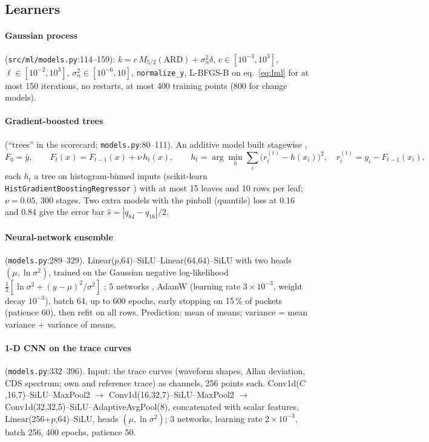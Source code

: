 \documentclass[10pt,a4paper]{article}
\newcommand{\code}[1]{\texttt{\small #1}}
\begin{document}
\subsection{Learners}
\paragraph{Gaussian process} (\code{src/ml/models.py}:114--159): $k=c\,M_{5/2}(\text{ARD})+\sigma_n^2\delta$,
$c\in[10^{-3},10^3]$, $\ell\in[10^{-2},10^3]$, $\sigma_n^2\in[10^{-6},10]$, \code{normalize\_y}, L-BFGS-B on eq.~\eqref{eq:lml}
for at most 150 iterations, no restarts, at most 400 training points (800 for change models).

\paragraph{Gradient-boosted trees} (``trees'' in the scorecard; \code{models.py}:80--111). An additive model built stagewise
\cite{friedman2001},
\begin{equation}
F_0=\bar y,\qquad F_t(x)=F_{t-1}(x)+\nu\,h_t(x),\qquad h_t=\arg\min_h\sum_i\big(r_i^{(t)}-h(x_i)\big)^2,\quad r_i^{(t)}=y_i-F_{t-1}(x_i),
\end{equation}
each $h_t$ a tree on histogram-binned inputs (scikit-learn \code{HistGradientBoostingRegressor} \cite{pedregosa2011,ke2017})
with at most 15 leaves and 10 rows per leaf; $\nu=0.05$, 300 stages. Two extra models with the pinball (quantile) loss
\cite{koenker1978} at 0.16 and 0.84 give the error bar $\hat s=|q_{84}-q_{16}|/2$.

\paragraph{Neural-network ensemble} (\code{models.py}:289--329). Linear($p$,64)--SiLU--Linear(64,64)--SiLU \cite{elfwing2018} with two
heads $(\mu,\ln\sigma^2)$, trained on the Gaussian negative log-likelihood $\tfrac12[\ln\sigma^2+(y-\mu)^2/\sigma^2]$
\cite{nix1994}; 5 networks \cite{lakshminarayanan2017}, AdamW \cite{loshchilov2019} (learning rate $3\times10^{-3}$, weight decay $10^{-3}$),
batch 64, up to 600 epochs, early stopping on 15\,\% of packets (patience 60), then refit on all rows. Prediction: mean of means;
variance = mean variance + variance of means.

\paragraph{1-D CNN on the trace curves} (\code{models.py}:332--396). Input: the trace curves (waveform shapes, Allan deviation,
CDS spectrum; own and reference trace) as channels, 256 points each. Conv1d($C$,16,7)--SiLU--MaxPool2 $\to$ Conv1d(16,32,7)--SiLU--MaxPool2
$\to$ Conv1d(32,32,5)--SiLU--AdaptiveAvgPool(8), concatenated with scalar features, Linear(256+$p$,64)--SiLU, heads $(\mu,\ln\sigma^2)$;
3 networks, learning rate $2\times10^{-3}$, batch 256, 400 epochs, patience 50.
\end{document}
